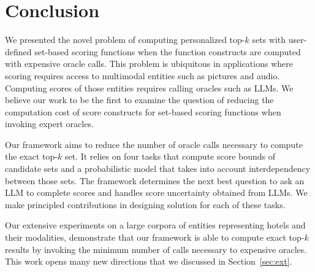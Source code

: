 \section{Conclusion}\label{sec:conc}
We presented the novel problem of computing personalized top-$k$ sets with user-defined set-based scoring functions when the function constructs are computed with expensive oracle calls. This problem is ubiquitous in applications where scoring requires access to multimodal entities such as pictures and audio. Computing scores of those entities requires calling oracles such as LLMs. We believe our work to be the first to examine the question of reducing the computation cost of score constructs for set-based scoring functions when invoking expert oracles.

Our framework aims to reduce the number of oracle calls necessary to compute the exact top-$k$ set. It relies on four tasks that compute score bounds of candidate sets and a probabilistic model that takes into account interdependency between those sets. The framework determines the next best question to ask an LLM to complete scores and handles score uncertainty obtained from LLMs. We make principled contributions in designing solution for each of these tasks.

Our extensive experiments on a large corpora of entities representing hotels and their modalities, demonstrate that our framework is able to compute exact top-$k$ results by invoking the minimum number of calls necessary to expensive oracles. This work opens many new directions that we discussed in Section~\ref{sec:ext}.